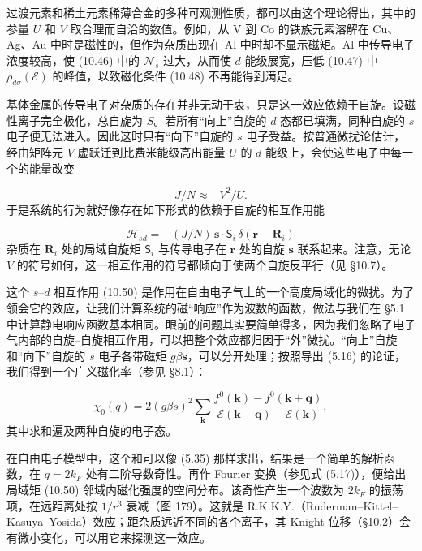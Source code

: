 过渡元素和稀土元素稀薄合金的多种可观测性质，都可以由这个理论得出，其中的参量 $U$ 和 $V$ 取合理而自洽的数值。例如，从 V 到 Co 的铁族元素溶解在 Cu、Ag、Au 中时是磁性的，但作为杂质出现在 Al 中时却不显示磁矩。Al 中传导电子浓度较高，使 (10.46) 中的 $\mathcal{N}_s$ 过大，从而使 $d$ 能级展宽，压低 (10.47) 中 $\rho_{d\sigma}(\mathcal{E})$ 的峰值，以致磁化条件 (10.48) 不再能得到满足。

基体金属的传导电子对杂质的存在并非无动于衷，只是这一效应依赖于自旋。设磁性离子完全极化，总自旋为 $S$。若所有“向上”自旋的 $d$ 态都已填满，同种自旋的 $s$ 电子便无法进入。因此这时只有“向下”自旋的 $s$ 电子受益。按普通微扰论估计，经由矩阵元 $V$ 虚跃迁到比费米能级高出能量 $U$ 的 $d$ 能级上，会使这些电子中每一个的能量改变

\begin{equation*}
J/N \approx -V^2/U. \tag{10.49}
\end{equation*}
于是系统的行为就好像存在如下形式的依赖于自旋的相互作用能

\begin{equation*}
\mathcal{H}_{sd} = -(J/N)\, \mathbf{s} \cdot \boldsymbol{\mathsf{S}}_i\, \delta(\mathbf{r} - \mathbf{R}_i) \tag{10.50}
\end{equation*}
杂质在 $\mathbf{R}_i$ 处的局域自旋矩 $\boldsymbol{\mathsf{S}}_i$ 与传导电子在 $\mathbf{r}$ 处的自旋 $\mathbf{s}$ 联系起来。注意，无论 $V$ 的符号如何，这一相互作用的符号都倾向于使两个自旋反平行（见 §10.7）。

这个 $s$–$d$ 相互作用 (10.50) 是作用在自由电子气上的一个高度局域化的微扰。为了领会它的效应，让我们计算系统的磁“响应”作为波数的函数，做法与我们在 §5.1 中计算静电响应函数基本相同。眼前的问题其实要简单得多，因为我们忽略了电子气内部的自旋–自旋相互作用，可以把整个效应都归因于“外”微扰。“向上”自旋和“向下”自旋的 $s$ 电子各带磁矩 $g\beta\mathbf{s}$，可以分开处理；按照导出 (5.16) 的论证，我们得到一个广义磁化率（参见 §8.1）：

\begin{equation*}
\chi_0(q) = 2(g\beta s)^2 \sum_{\mathbf{k}} \frac{f^0(\mathbf{k}) - f^0(\mathbf{k}+\mathbf{q})}{\mathcal{E}(\mathbf{k}+\mathbf{q}) - \mathcal{E}(\mathbf{k})}, \tag{10.51}
\end{equation*}
其中求和遍及两种自旋的电子态。

在自由电子模型中，这个和可以像 (5.35) 那样求出，结果是一个简单的解析函数，在 $q = 2k_F$ 处有二阶导数奇性。再作 Fourier 变换（参见式 (5.17)），便给出局域矩 (10.50) 邻域内磁化强度的空间分布。该奇性产生一个波数为 $2k_F$ 的振荡项，在远距离处按 $1/r^3$ 衰减（图 179）。这就是 R.K.K.Y.（Ruderman--Kittel--Kasuya--Yosida）效应；距杂质远近不同的各个离子，其 Knight 位移（§10.2）会有微小变化，可以用它来探测这一效应。

